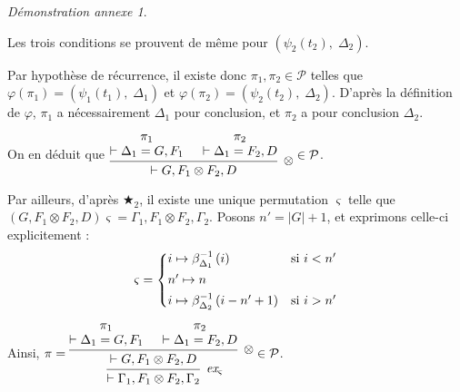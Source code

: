 \documentclass[11pt,a4paper]{article}
\theoremstyle{plain}
\theoremstyle{definition}
\theoremstyle{remark}
\newtheorem{demonstrationappendix}{Démonstration annexe}
\newcommand*{\tensor}{\otimes}
\newcommand*{\namedproofv}[2]{\hypo{#1}\infer[no rule]{1}{\vdash #2}}
\newcommand*{\tensorv}[1]{\infer{2}[\ensuremath{\tensor}]{\vdash #1}}
\newcommand*{\permv}[2]{\infer{1}[\ensuremath{\textit{ex}_{#1}}]{\vdash #2}}
\newcommand*{\permapp}[2]{#2 #1}
\newcommand*{\someperm}{\varsigma}
\newcommand*{\sequent}{\Gamma}
\newcommand*{\sequentbis}{\Delta}
\newcommand*{\proofs}{\ensuremath{\mathcal{P}}}
\newcommand*{\encode}{\ensuremath{\varphi}}
\begin{document}
\begin{demonstrationappendix}
\begin{description}
        Les trois conditions se prouvent de même pour $\left( \psi_2 \left( t_2 \right), \; \sequentbis_2 \right)$.
    
        Par hypothèse de récurrence, il existe donc $\pi_1, \pi_2 \in \proofs$ telles que $\encode \left( \pi_1 \right) = \left( \psi_1 \left( t_1 \right), \; \sequentbis_1 \right)$ et $\encode \left( \pi_2 \right) = \left( \psi_2 \left( t_2 \right), \; \sequentbis_2 \right)$. D'après la définition de $\encode$, $\pi_1$ a nécessairement $\sequentbis_1$ pour conclusion, et $\pi_2$ a pour conclusion $\sequentbis_2$.
        
        On en déduit que 
        $\begin{prooftree}
            \namedproofv{\pi_1}{\sequentbis_1 = G, F_1}
            \namedproofv{\pi_2}{\sequentbis_1 = F_2, D}
            \tensorv{G, F_1 \tensor F_2, D}
        \end{prooftree} 
        \in \proofs$. 
    
        Par ailleurs, d'après $\bigstar_2$, il existe une unique permutation $\someperm$ telle que $\permapp{\someperm}{(G, F_1 \tensor F_2, D)} = \sequent_1, F_1 \tensor F_2, \sequent_2$. Posons $n' = | G | + 1$, et exprimons celle-ci explicitement :
        \begin{equation*}
            \someperm = 
            \begin{cases*}
                i \mapsto \beta_{\sequentbis_1}^{-1} \left( i \right) & si $i < n' $\\
                n' \mapsto n \\
                i \mapsto \beta_{\sequentbis_2}^{-1} \left( i - n' + 1 \right) & si $i > n' $\\
            \end{cases*}
        \end{equation*}
    
        Ainsi, $\pi =
        \begin{prooftree}
            \namedproofv{\pi_1}{\sequentbis_1 = G, F_1}
            \namedproofv{\pi_2}{\sequentbis_1 = F_2, D}
            \tensorv{G, F_1 \tensor F_2, D}
            \permv{\someperm}{\sequent_1, F_1 \tensor F_2, \sequent_2}
        \end{prooftree} 
        \in \proofs$. 
    

\end{description}
\end{demonstrationappendix}
\end{document}
